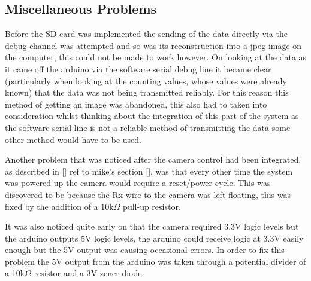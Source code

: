 \subsection{Miscellaneous Problems}

Before the SD-card was implemented the sending of the data directly via the debug channel was attempted and so was its reconstruction into a jpeg image on the computer, this could not be made to work however. On looking at the data as it came off the arduino via the software serial debug line it became clear (particularly when looking at the counting values, whose values were already known) that the data was not being transmitted reliably. For this reason this method of getting an image was abandoned, this also had to taken into consideration whilst thinking about the integration of this part of the system as the software serial line is not a reliable method of transmitting the data some other method would have to be used.

Another problem that was noticed after the camera control had been integrated, as described in [] ref to mike's section [], was that every other time the system was powered up the camera would require a reset/power cycle. This was discovered to be because the Rx wire to the camera was left floating, this was fixed by the addition of a 10k$\Omega$ pull-up resistor.

It was also noticed quite early on that the camera required 3.3V logic levels but the arduino outputs 5V logic levels, the arduino could receive logic at 3.3V easily enough but the 5V output was causing occasional errors. In order to fix this problem the 5V output from the arduino was taken through a potential divider of a 10k$\Omega$ resistor and a 3V zener diode.